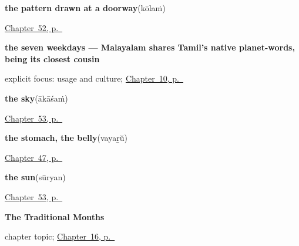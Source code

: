 \noindent\begin{minipage}[t]{\linewidth}
\raggedright
\textbf{the pattern drawn at a doorway}\enspace\emph{}\enspace(kōlaṁ)\par
\footnotesize \hyperref[ch:ml-welcoming-a-guest]{Chapter~52, p.~\pageref*{ch:ml-welcoming-a-guest}}
\end{minipage}\par\smallskip

\noindent\begin{minipage}[t]{\linewidth}
\raggedright
\textbf{the seven weekdays — Malayalam shares Tamil's native planet-words, being its closest cousin}\enspace\emph{      }\par
\footnotesize explicit focus: usage and culture; \hyperref[ch:ml-days-of-the-week]{Chapter~10, p.~\pageref*{ch:ml-days-of-the-week}}
\end{minipage}\par\smallskip

\noindent\begin{minipage}[t]{\linewidth}
\raggedright
\textbf{the sky}\enspace\emph{}\enspace(ākāśaṁ)\par
\footnotesize \hyperref[ch:ml-overhead]{Chapter~53, p.~\pageref*{ch:ml-overhead}}
\end{minipage}\par\smallskip

\noindent\begin{minipage}[t]{\linewidth}
\raggedright
\textbf{the stomach, the belly}\enspace\emph{}\enspace(vayaṟŭ)\par
\footnotesize \hyperref[ch:ml-body-more]{Chapter~47, p.~\pageref*{ch:ml-body-more}}
\end{minipage}\par\smallskip

\noindent\begin{minipage}[t]{\linewidth}
\raggedright
\textbf{the sun}\enspace\emph{}\enspace(sūryan)\par
\footnotesize \hyperref[ch:ml-overhead]{Chapter~53, p.~\pageref*{ch:ml-overhead}}
\end{minipage}\par\smallskip

\noindent\begin{minipage}[t]{\linewidth}
\raggedright
\textbf{The Traditional Months}\par
\footnotesize chapter topic; \hyperref[ch:ml-traditional-months]{Chapter~16, p.~\pageref*{ch:ml-traditional-months}}
\end{minipage}\par\smallskip

